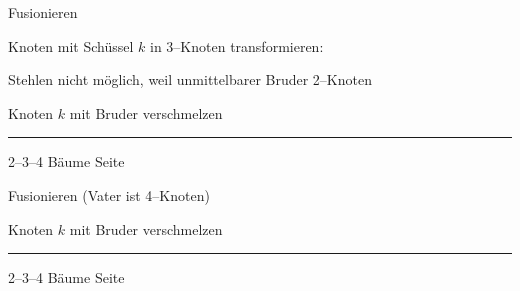 
\begin{slide}{}
\normalsize

\begin{center}
Fusionieren
\end{center}
\vspace*{0.5cm}

\footnotesize
Knoten mit Sch\"ussel $k$  in 3--Knoten transformieren:

Stehlen nicht m\"oglich, weil unmittelbarer Bruder 2--Knoten

\hspace*{1.3cm} 

Knoten $k$ mit Bruder verschmelzen

\hspace*{1.3cm} 


\vspace*{\fill}
\tiny \addtocounter{mypage}{1}
\rule{17cm}{1mm}
2--3--4 B\"aume  \hspace*{\fill} Seite 
\end{slide}


\begin{slide}{}
\normalsize

\begin{center}
Fusionieren (Vater ist 4--Knoten)
\end{center}
\vspace*{0.5cm}

\footnotesize
\footnotesize

\hspace*{1.3cm} 

Knoten $k$ mit Bruder verschmelzen

\hspace*{1.3cm} 

\vspace*{\fill}
\tiny \addtocounter{mypage}{1}
\rule{17cm}{1mm}
2--3--4 B\"aume  \hspace*{\fill} Seite 
\end{slide}


